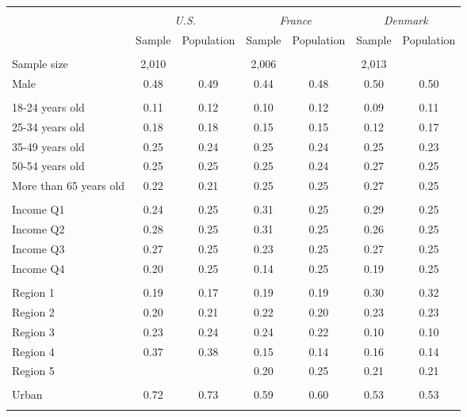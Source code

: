 \begin{tabular}{lcccccc}
\toprule
\hline \\[-1.8ex]
\multicolumn{1}{c}{\em{ }} & \multicolumn{2}{c}{\em{U.S.}} & \multicolumn{2}{c}{\em{France}} & \multicolumn{2}{c}{\em{Denmark}}\\
\cmidrule(l{3pt}r{3pt}){2-3} \cmidrule(l{3pt}r{3pt}){4-5} \cmidrule(l{3pt}r{3pt}){6-7}
\noalign{\smallskip}  & Sample & Population & Sample & Population & Sample & Population \\
\hline \\[-1.8ex] 
Sample size & 2,010 & & 2,006 &  & 2,013 & \\
\noalign{\smallskip}\hline \noalign{\smallskip}Male & 0.48 & 0.49 & 0.44 & 0.48 & 0.50 & 0.50\\ 
\\
18-24 years old & 0.11 & 0.12 & 0.10 & 0.12 & 0.09 & 0.11\\
25-34 years old & 0.18 & 0.18 & 0.15 & 0.15 & 0.12 & 0.17\\
35-49 years old & 0.25 & 0.24 & 0.25 & 0.24 & 0.25 & 0.23\\
50-54 years old & 0.25 & 0.25 & 0.25 & 0.24 & 0.27 & 0.25\\
More than 65 years old & 0.22 & 0.21 & 0.25 & 0.25 & 0.27 & 0.25\\ 
\\
Income Q1 & 0.24 & 0.25 & 0.31 & 0.25 & 0.29 & 0.25\\
Income Q2 & 0.28 & 0.25 & 0.31 & 0.25 & 0.26 & 0.25\\
Income Q3 & 0.27 & 0.25 & 0.23 & 0.25 & 0.27 & 0.25\\
Income Q4 & 0.20 & 0.25 & 0.14 & 0.25 & 0.19 & 0.25\\
\\
Region 1 & 0.19 & 0.17 & 0.19 & 0.19 & 0.30 & 0.32\\
Region 2 & 0.20 & 0.21 & 0.22 & 0.20 & 0.23 & 0.23\\
Region 3 & 0.23 & 0.24 & 0.24 & 0.22 & 0.10 & 0.10\\
Region 4 & 0.37 & 0.38 & 0.15 & 0.14 & 0.16 & 0.14\\
Region 5 &  &  & 0.20 & 0.25 & 0.21 & 0.21\\
\\
Urban & 0.72 & 0.73 & 0.59 & 0.60 & 0.53 & 0.53\\
\\
\bottomrule
\end{tabular}